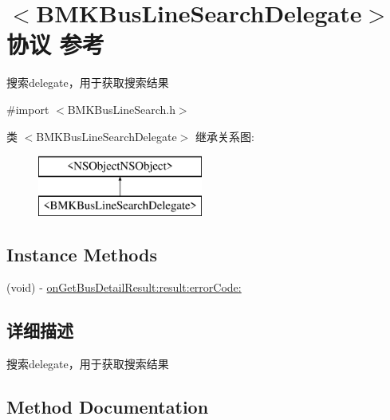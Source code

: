 \hypertarget{protocol_b_m_k_bus_line_search_delegate-p}{}\section{$<$B\+M\+K\+Bus\+Line\+Search\+Delegate$>$协议 参考}
\label{protocol_b_m_k_bus_line_search_delegate-p}


搜索delegate，用于获取搜索结果  




{\ttfamily \#import $<$B\+M\+K\+Bus\+Line\+Search.\+h$>$}

类 $<$B\+M\+K\+Bus\+Line\+Search\+Delegate$>$ 继承关系图\+:\begin{figure}[H]
\begin{center}
\leavevmode
\includegraphics[height=2.000000cm]{protocol_b_m_k_bus_line_search_delegate-p}
\end{center}
\end{figure}
\subsection*{Instance Methods}
\begin{DoxyCompactItemize}
\item 
(void) -\/ \hyperlink{protocol_b_m_k_bus_line_search_delegate-p_ae1c5bce88d11150d38f8179368f39137}{on\+Get\+Bus\+Detail\+Result\+:result\+:error\+Code\+:}
\end{DoxyCompactItemize}


\subsection{详细描述}
搜索delegate，用于获取搜索结果 

\subsection{Method Documentation}
\hypertarget{protocol_b_m_k_bus_line_search_delegate-p_ae1c5bce88d11150d38f8179368f39137}{}
